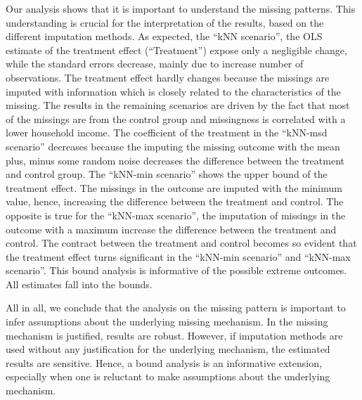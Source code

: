 Our analysis shows that it is important to understand the missing patterns. This understanding is crucial for the interpretation of the results, based on the different imputation methods. As expected, the ``kNN scenario'', the \ac{OLS} estimate of the treatment effect (``Treatment'') expose only a negligible change, while the standard errors decrease, mainly due to increase number of observations. The treatment effect hardly changes because the missings are imputed with information which is closely related to the characteristics of the missing. The results in the remaining scenarios are driven by the fact that most of the missings are from the control group and missingness is correlated with a lower household income. The coefficient of the treatment in the ``kNN-msd scenario'' decreases because the imputing the missing outcome with the mean plus, minus some random noise decreases the difference between the treatment and control group. The ``kNN-min scenario'' shows the upper bound of the treatment effect. The missings in the outcome are imputed with the minimum value, hence, increasing the difference between the treatment and control. The opposite is true for the ``kNN-max scenario'', the imputation of missings in the outcome with a maximum increase the difference between the treatment and control. The contract between the treatment and control becomes so evident that the treatment effect turns significant in the ``kNN-min scenario'' and ``kNN-max scenario''. This bound analysis is informative of the possible extreme outcomes. All estimates fall into the bounds.

All in all, we conclude that the analysis on the missing pattern is important to infer assumptions about the underlying missing mechanism. In the missing mechanism is justified, results are robust. However, if imputation methods are used without any justification for the underlying mechanism, the estimated results are sensitive. Hence, a bound analysis is an informative extension, especially when one is reluctant to make assumptions about the underlying mechanism.